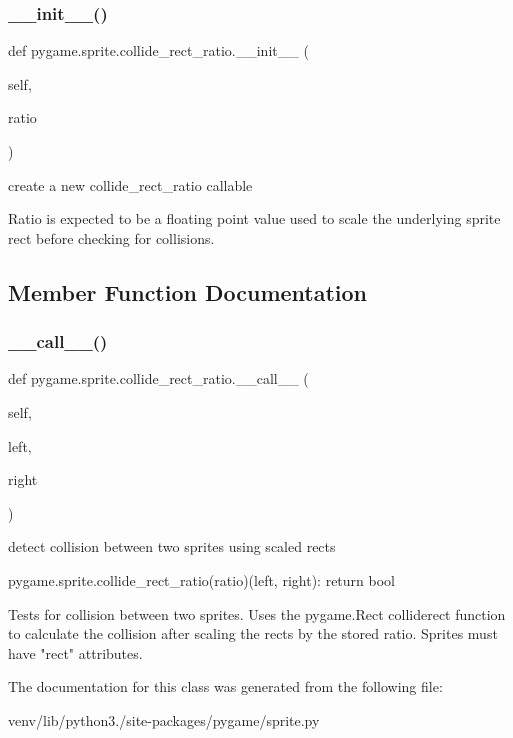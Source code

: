 \subsubsection{\texorpdfstring{\+\_\+\+\_\+init\+\_\+\+\_\+()}{\_\_init\_\_()}}
{\footnotesize\ttfamily def pygame.\+sprite.\+collide\+\_\+rect\+\_\+ratio.\+\_\+\+\_\+init\+\_\+\+\_\+ (\begin{DoxyParamCaption}\item[{}]{self,  }\item[{}]{ratio }\end{DoxyParamCaption})}

\begin{DoxyVerb}create a new collide_rect_ratio callable

Ratio is expected to be a floating point value used to scale
the underlying sprite rect before checking for collisions.\end{DoxyVerb}
 

\subsection{Member Function Documentation}
\mbox{\label{classpygame_1_1sprite_1_1collide__rect__ratio_a22ec6617fbedeafe60940938592dc3ee}} 
\subsubsection{\texorpdfstring{\+\_\+\+\_\+call\+\_\+\+\_\+()}{\_\_call\_\_()}}
{\footnotesize\ttfamily def pygame.\+sprite.\+collide\+\_\+rect\+\_\+ratio.\+\_\+\+\_\+call\+\_\+\+\_\+ (\begin{DoxyParamCaption}\item[{}]{self,  }\item[{}]{left,  }\item[{}]{right }\end{DoxyParamCaption})}

\begin{DoxyVerb}detect collision between two sprites using scaled rects

pygame.sprite.collide_rect_ratio(ratio)(left, right): return bool

Tests for collision between two sprites. Uses the pygame.Rect
colliderect function to calculate the collision after scaling the rects
by the stored ratio. Sprites must have "rect" attributes.\end{DoxyVerb}
 

The documentation for this class was generated from the following file\+:\begin{DoxyCompactItemize}
\item 
venv/lib/python3./site-\/packages/pygame/sprite.\+py\end{DoxyCompactItemize}
